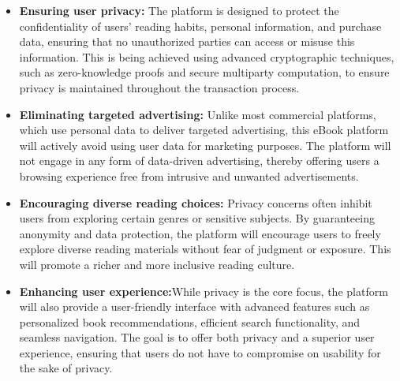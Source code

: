 \documentclass[12pt]{article}
\begin{document}
\begin{itemize}
	\item \textbf{Ensuring user privacy:}	 The platform is designed to protect the confidentiality of users' reading habits, personal information, and purchase data, ensuring that no unauthorized parties can access or misuse this information. This is being achieved using advanced cryptographic techniques, such as zero-knowledge proofs and secure multiparty computation, to ensure privacy is maintained throughout the transaction process.
	\item \textbf{	Eliminating targeted advertising: }Unlike most commercial platforms, which use personal data to deliver targeted advertising, this eBook platform will actively avoid using user data for marketing purposes. The platform will not engage in any form of data-driven advertising, thereby offering users a browsing experience free from intrusive and unwanted advertisements.
	\item \textbf{	Encouraging diverse reading choices: }Privacy concerns often inhibit users from exploring certain genres or sensitive subjects. By guaranteeing anonymity and data protection, the platform will encourage users to freely explore diverse reading materials without fear of judgment or exposure. This will promote a richer and more inclusive reading culture.
	\item \textbf{	Enhancing user experience:}While privacy is the core focus, the platform will also provide a user-friendly interface with advanced features such as personalized book recommendations, efficient search functionality, and seamless navigation. The goal is to offer both privacy and a superior user experience, ensuring that users do not have to compromise on usability for the sake of privacy.
\end{itemize}
\end{document}
